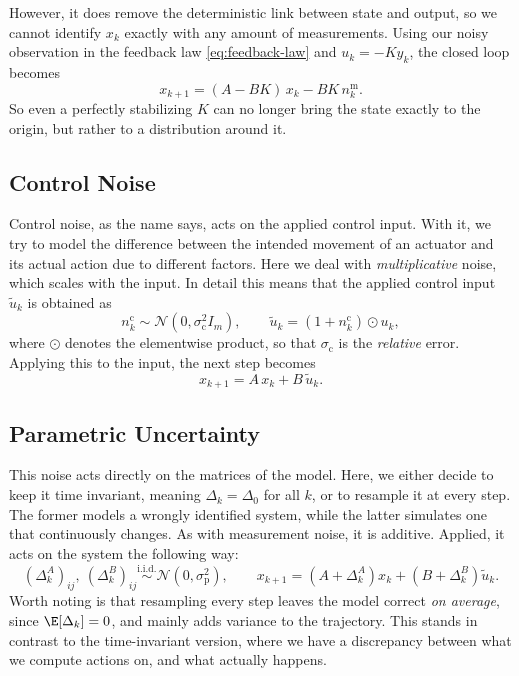 However, it does remove the deterministic link between state and
output, so we cannot identify $x_k$ exactly with any amount of measurements. Using
our noisy observation in the feedback law \eqref{eq:feedback-law} and $u_k = -K y_k$, 
the closed loop becomes
\begin{equation}
    \label{eq:measurement-closed-loop}
    x_{k+1} = (A - BK)\, x_k - BK\, n^{\mathrm{m}}_k .
\end{equation}
So even a perfectly stabilizing $K$ can no longer bring the state exactly to the origin, 
but rather to a distribution around it.

\subsection{Control Noise}
\label{subsec:control-noise}

Control noise, as the name says, acts on the applied control input. With it,
we try to model the difference between the intended movement of an actuator
and its actual action due to different factors. Here we deal with
\emph{multiplicative} noise, which scales with the input. In
detail this means that the applied control input $\tilde{u}_k$ is obtained as
\begin{equation}
    \label{eq:control-noise}
    n^{\mathrm{c}}_k \sim \mathcal{N}\!\left(0, \sigma_{\mathrm{c}}^{2} I_m\right),
    \qquad
    \tilde{u}_k = \left( 1 + n^{\mathrm{c}}_k \right) \odot u_k ,
\end{equation}
where $\odot$ denotes the elementwise product, so that $\sigma_{\mathrm{c}}$ is
the \emph{relative} error. Applying this to the input, the next step becomes
\begin{equation}
    \label{eq:control-noise-step}
    x_{k+1} = A\, x_k + B\, \tilde{u}_k .
\end{equation}
\subsection{Parametric Uncertainty}
\label{subsec:parametric-uncertainty}

This noise acts directly on the matrices of the model. Here, we either decide to keep
it time invariant, meaning $\Delta_k = \Delta_0$ for all $k$, or to resample it
at every step. The former models a wrongly identified system, while the latter
simulates one that continuously changes. As with measurement noise, it is additive. 
Applied, it acts on the system the
following way:
\begin{equation}
    \label{eq:parametric-noise}
    \left( \Delta_k^{A} \right)_{ij},\ \left( \Delta_k^{B} \right)_{ij}
    \overset{\text{i.i.d.}}{\sim} \mathcal{N}\!\left(0, \sigma_{\mathrm{p}}^{2}\right),
    \qquad
    x_{k+1} = \left( A + \Delta_k^{A} \right) x_k + \left( B + \Delta_k^{B} \right) \tilde{u}_k .
\end{equation}
Worth noting is that resampling every
step leaves the model correct \emph{on average}, since
$\E[\Delta_k] = 0$, and mainly adds variance to the trajectory. This stands
in contrast to the time-invariant version, where we have a discrepancy between
what we compute actions on, and what actually happens.

